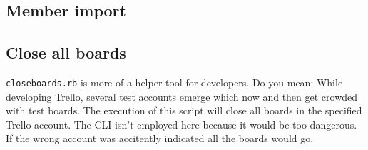 


\subsection{Member import}


\subsection{Close all boards}
\texttt{closeboards.rb} is more of a helper tool for developers. Do you mean: While developing Trello, several test accounts emerge which now and then get crowded with test boards. The execution of this script will close all boards in the specified Trello account. The CLI isn't employed here because it would be too dangerous. If the wrong account was accitently indicated all the boards would go.

